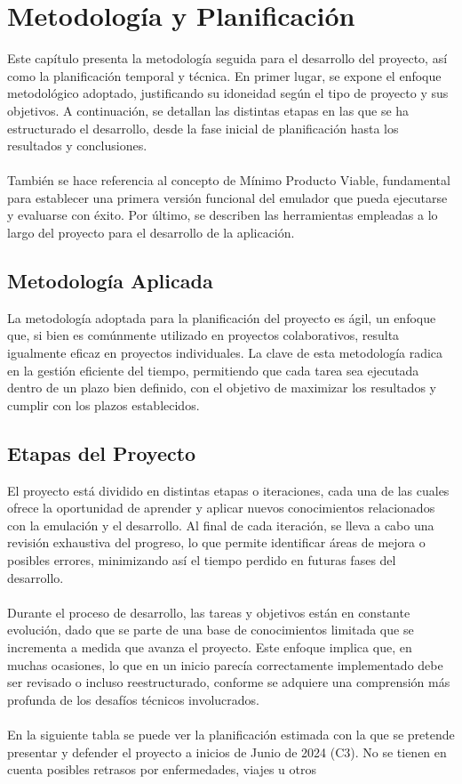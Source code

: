 \chapter{Metodología y Planificación}
\label{planificacion}

Este capítulo presenta la metodología seguida para el desarrollo del proyecto, así como la planificación temporal y técnica. En primer lugar, se expone el enfoque metodológico adoptado, justificando su idoneidad según el tipo de proyecto y sus objetivos. A continuación, se detallan las distintas etapas en las que se ha estructurado el desarrollo, desde la fase inicial de planificación hasta los resultados y conclusiones.
\\\\
También se hace referencia al concepto de Mínimo Producto Viable, fundamental para establecer una primera versión funcional del emulador que pueda ejecutarse y evaluarse con éxito. Por último, se describen las herramientas empleadas a lo largo del proyecto para el desarrollo de la aplicación.

\section{Metodología Aplicada}
La metodología adoptada para la planificación del proyecto es ágil, un enfoque que, si bien es comúnmente utilizado en proyectos colaborativos, resulta igualmente eficaz en proyectos individuales. La clave de esta metodología radica en la gestión eficiente del tiempo, permitiendo que cada tarea sea ejecutada dentro de un plazo bien definido, con el objetivo de maximizar los resultados y cumplir con los plazos establecidos.

\section{Etapas del Proyecto}
El proyecto está dividido en distintas etapas o iteraciones, cada una de las cuales ofrece la oportunidad de aprender y aplicar nuevos conocimientos relacionados con la emulación y el desarrollo. Al final de cada iteración, se lleva a cabo una revisión exhaustiva del progreso, lo que permite identificar áreas de mejora o posibles errores, minimizando así el tiempo perdido en futuras fases del desarrollo.
\\\\
Durante el proceso de desarrollo, las tareas y objetivos están en constante evolución, dado que se parte de una base de conocimientos limitada que se incrementa a medida que avanza el proyecto. Este enfoque implica que, en muchas ocasiones, lo que en un inicio parecía correctamente implementado debe ser revisado o incluso reestructurado, conforme se adquiere una comprensión más profunda de los desafíos técnicos involucrados.
\\\\
En la siguiente tabla se puede ver la planificación estimada con la que se pretende presentar y defender el proyecto a inicios de Junio de 2024 (C3). No se tienen en cuenta posibles retrasos por enfermedades, viajes u otros

